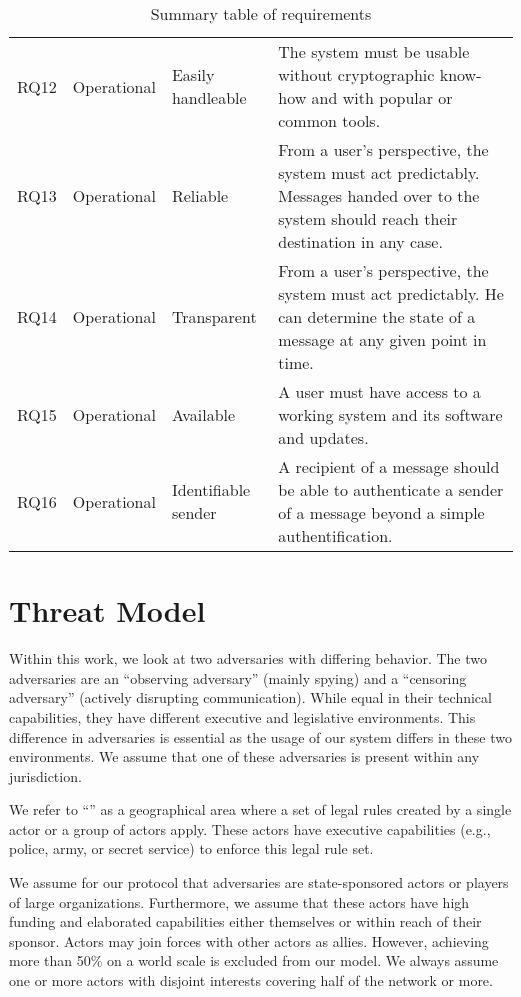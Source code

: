 \begin{table*}[ht]
\begin{tabular}{|l|l|l|p{9.8cm}|}
		RQ12 & Operational & Easily handleable     & The system must be usable without cryptographic know-how and with popular or common tools. \\
		RQ13 & Operational & Reliable            & From a user's perspective, the system must act predictably. Messages handed over to the system should reach their destination in any case. \\
		RQ14 & Operational & Transparent         & From a user's perspective, the system must act predictably. He can determine the state of a message at any given point in time. \\
		RQ15 & Operational & Available           & A user must have access to a working system and its software and updates. \\
		RQ16 & Operational & Identifiable sender & A recipient of a message should be able to authenticate a sender of a message beyond a simple authentification.\\\hline
		
	\end{tabular}
	\egroup
	\caption{Summary table of requirements}
	\label{tab:requiremnts}
\end{table*}

\section{Threat Model}\label{sec:adversary}
Within this work, we look at two adversaries with differing behavior. The two adversaries are an ``observing adversary'' (mainly spying) and a ``censoring adversary'' (actively disrupting communication). While equal in their technical capabilities, they have different executive and legislative environments. This difference in adversaries is essential as the usage of our system differs in these two environments. We assume that one of these adversaries is present within any jurisdiction. 

We refer to ``'' as a geographical area where a set of legal rules created by a single actor or a group of actors apply. These actors have executive capabilities (e.g., police, army, or secret service) to enforce this legal rule set.

We assume for our protocol that adversaries are state-sponsored actors or players of large organizations. Furthermore, we assume that these actors have high funding and elaborated capabilities either themselves or within reach of their sponsor. Actors may join forces with other actors as allies. However, achieving more than 50\% on a world scale is excluded from our model. We always assume one or more actors with disjoint interests covering half of the network or more. 

